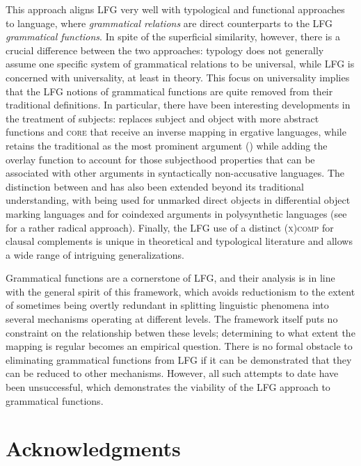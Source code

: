 \documentclass[output=paper]{../langscibook}
\begin{document}
 \hspace*{-1.7pt}This approach aligns LFG very well with typological and functional approaches to language, where \textit{grammatical relations} are direct counterparts to the LFG \textit{grammatical functions}. In spite of the superficial similarity, however, there is a crucial difference between the two approaches: typology does not generally assume one specific system of grammatical relations to be universal, while LFG is concerned with universality, at least in theory. This focus on universality implies that the LFG notions of grammatical functions are quite removed from their traditional definitions. In particular, there have been interesting developments in the treatment of subjects: \citet{Manning1996} replaces subject and object with more abstract functions \PIVOT and \textsc{core} that receive an inverse mapping in ergative languages, while \citet{falk06} retains the traditional \SUBJ as the most prominent argument (\GFHAT) while adding the overlay function \PIVOT to account for those subjecthood properties that can be associated with other arguments in syntactically non-accusative languages. The distinction between \OBJ and {\OBJTHETA} has also been extended beyond its traditional understanding, with {\OBJTHETA} being used for unmarked direct objects in differential object marking languages \citep{DN} and for coindexed arguments in polysynthetic languages (see \cite{lander-etal2021} for a rather radical approach). Finally, the LFG use of a distinct \GF \textsc{(x)comp} for clausal complements is unique in theoretical and typological literature and allows a wide range of intriguing generalizations.
 
 Grammatical functions are a cornerstone of LFG, and their analysis is in line with the general spirit of this framework, which avoids reductionism to the extent of sometimes being overtly redundant in splitting linguistic phenomena into several mechanisms operating at different levels. The framework itself puts no constraint on the relationship betwen these levels; determining to what extent the mapping is regular becomes an empirical question. There is no formal obstacle to eliminating grammatical functions from LFG if it can be demonstrated that they can be reduced to other mechanisms. However, all such attempts to date have been unsuccessful, which demonstrates the viability of the LFG approach to grammatical functions.

 \section*{Acknowledgments}
\end{document}
